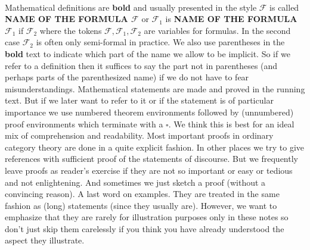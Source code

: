 \\
Mathematical definitions are \textbf{bold} and usually presented in the style {\glqq}$\mathcal{F}$ is called \textbf{NAME OF THE FORMULA $\mathcal{F}$}{\grqq} or {\glqq}$\mathcal{F}_{1}$ is \textbf{NAME OF THE FORMULA $\mathcal{F}_{1}$} if $\mathcal{F}_{2}${\grqq} where the tokens $\mathcal{F},\mathcal{F}_{1},\mathcal{F}_{2}$ are variables for formulas. In the second case $\mathcal{F}_{2}$ is often only semi-formal in practice. We also use parentheses in the \textbf{bold} text to indicate which part of the name we allow to be implicit. So if we refer to a definition then it suffices to say the part not in parentheses (and perhaps parts of the parenthesized name) if we do not have to fear misunderstandings. Mathematical statements are made and proved in the running text. But if we later want to refer to it or if the statement is of particular importance we use numbered theorem environments followed by (unnumbered) proof environments which terminate with a $\square$. We think this is best for an ideal mix of comprehension and readability. Most important proofs in ordinary category theory are done in a quite explicit fashion. In other places we try to give references with sufficient proof of the statements of discourse. But we frequently leave proofs as reader's exercise if they are not so important or easy or tedious and not enlightening. And sometimes we just sketch a proof (without a convincing reason). A last word on examples. They are treated in the same fashion as (long) statements (since they usually are). However, we want to emphasize that they are rarely for illustration purposes only in these notes so don't just skip them carelessly if you think you have already understood the aspect they illustrate.
